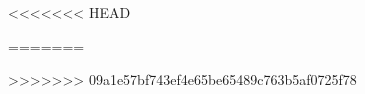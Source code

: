 \documentclass[listblue]{Sel} %
\begin{document}
<<<<<<< HEAD

\compendium
=======
\compendium

>>>>>>> 09a1e57bf743ef4e65be65489c763b5af0725f78
\end{document}
